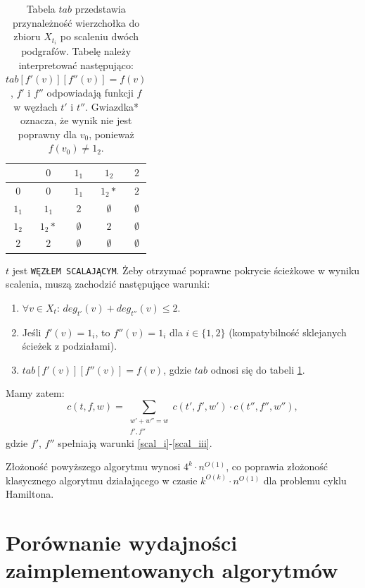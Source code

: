 \documentclass[12pt, oneside]{report}
\newcommand\Omicron{O}
\begin{document}
\begin{table}
\centering
\begin{tabular}{c|c|c|c|c}
 & $0$ & $1_1$ & $1_2$ & $2$ \\
\hline
$0$ & $0$ & $1_1$ & $1_2*$ & $2$ \\
\hline
$1_1$ & $1_1$ & $2$ & $\emptyset$ & $\emptyset$ \\
\hline
$1_2$ & $1_2*$ & $\emptyset$ & $2$ & $\emptyset$ \\
\hline
$2$ & $2$ & $\emptyset$ & $\emptyset$ & $\emptyset$ \\
\end{tabular}
\caption{Tabela $tab$ przedstawia przynależność wierzchołka do zbioru $X_{t_i}$ po scaleniu dwóch podgrafów. Tabelę należy interpretować następująco: $tab[f'(v)][f''(v)] = f(v)$, $f'$ i $f''$ odpowiadają funkcji $f$ w węzłach $t'$ i $t''$. Gwiazdka* oznacza, że wynik nie jest poprawny dla $v_0$, ponieważ $f(v_0) \neq 1_2$.}
\label{merge_table}
\end{table}
\noindent$t$ jest \texttt{WĘZŁEM SCALAJĄCYM}. Żeby otrzymać poprawne pokrycie ścieżkowe w wyniku scalenia, muszą zachodzić następujące warunki:
\begin{enumerate}[label=(\roman*)]
\item \label{scal_i}$\forall v \in X_t$: $deg_{t'}(v) + deg_{t''}(v) \leq 2$.
\item Jeśli $f'(v) = 1_i$, to $f''(v) = 1_i$ dla $i \in \{1,2\}$ (kompatybilność sklejanych ścieżek z podziałami).
\item \label{scal_iii}$tab[f'(v)][f''(v)] = f(v)$, gdzie $tab$ odnosi się do tabeli \ref{merge_table}.
\end{enumerate}
Mamy zatem:
$$c(t,f,w) = \sum \limits_{\substack{w' + w'' = w \\ f',f''}} c(t',f',w') \cdot c(t'',f'',w''),$$ gdzie $f'$, $f''$ spełniają warunki \ref{scal_i}-\ref{scal_iii}.

Złożoność powyższego algorytmu wynosi $4^k \cdot n^{\Omicron(1)}$, co poprawia złożoność klasycznego algorytmu działającego w czasie $k^{\Omicron{(k)}} \cdot n^{\Omicron{(1)}}$ dla problemu cyklu Hamiltona.

\newpage
  	\chapter{Porównanie wydajności zaimplementowanych algorytmów}
  	\label{summary}
\end{document}
